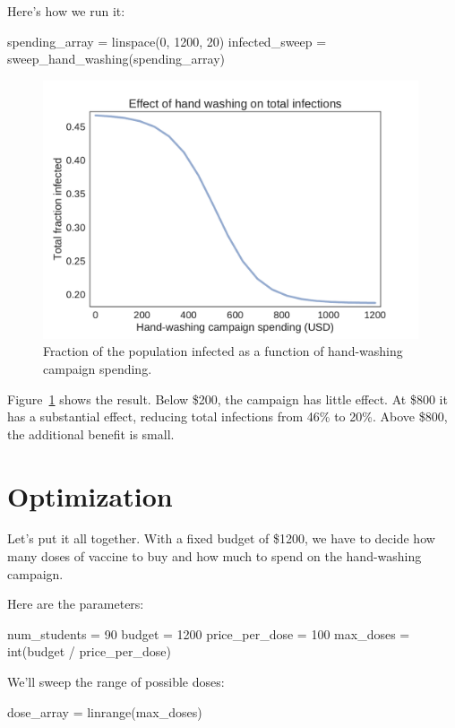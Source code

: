 \documentclass[12pt]{book}
\theoremstyle{exercise}
\begin{document}
Here's how we run it:

\begin{python}
spending_array = linspace(0, 1200, 20)
infected_sweep = sweep_hand_washing(spending_array)
\end{python}

\begin{figure}
\centerline{\includegraphics[height=3in]{figs/chap05-fig05.pdf}}
\caption{Fraction of the population infected as a function of hand-washing campaign spending.}
\label{chap05-fig05}
\end{figure} 

Figure~\ref{chap05-fig05} shows the result.  Below \$200, the campaign has little effect.  At \$800 it has a substantial effect, reducing total infections from 46\% to 20\%.  Above \$800, the additional benefit is small.


\section{Optimization} 

Let's put it all together.  With a fixed budget of \$1200, we have to decide how many doses of vaccine to buy and how much to spend on the hand-washing campaign.

Here are the parameters:

\begin{python}
num_students = 90
budget = 1200
price_per_dose = 100
max_doses = int(budget / price_per_dose)
\end{python}

We'll sweep the range of possible doses:

\begin{python}
dose_array = linrange(max_doses)
\end{python}
\end{document}
